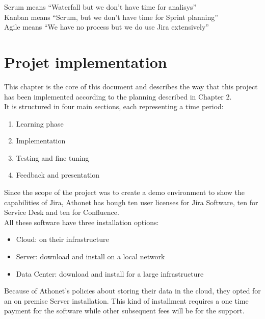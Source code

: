 \begin{savequote}[90mm]
	Scrum means ``Waterfall but we don't have time for analisys''\\
	Kanban means ``Scrum, but we don't have time for Sprint planning''\\
	Agile means ``We have no process but we do use Jira extensively''
\end{savequote}

\chapter{Projet implementation}
	This chapter is the core of this document and describes the way that this project has been implemented according to the planning described in Chapter 2.\\
	It is structured in four main sections, each representing a time period:
	\begin{enumerate}
		\item Learning phase
		\item Implementation
		\item Testing and fine tuning
		\item Feedback and presentation
	\end{enumerate}
	Since the scope of the project was to create a demo environment to show the capabilities of Jira, Athonet has bough ten user licenses for Jira Software, ten for Service Desk and ten for Confluence.\\
	All these software have three installation options:
	\begin{itemize}
		\item Cloud: on their infrastructure
		\item Server: download and install on a local network
		\item Data Center: download and install for a large infrastructure
	\end{itemize}
	Because of Athonet's policies about storing their data in the cloud, they opted for an on premise Server installation.
	This kind of installment requires a one time payment for the software while other subsequent fees will be for the support.

